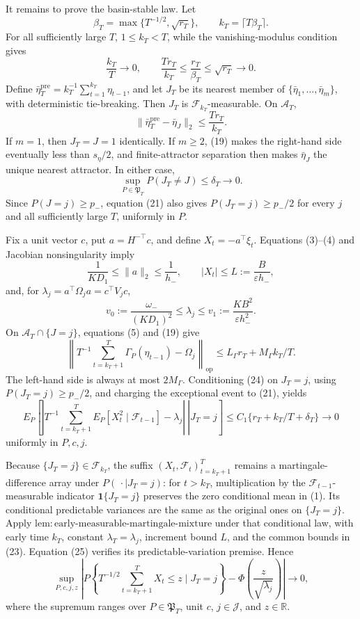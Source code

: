 It remains to prove the basin-stable law. Let
\[
 \beta_T=\max\{T^{-1/2},\sqrt{r_T}\},
 \qquad k_T=\lceil T\beta_T\rceil.
\tag{18}
\]
For all sufficiently large \(T\), \(1\le k_T<T\), while the vanishing-modulus condition gives
\[
 \frac{k_T}{T}\longrightarrow0,
 \qquad \frac{Tr_T}{k_T}\le\frac{r_T}{\beta_T}\le\sqrt{r_T}\longrightarrow0.
\tag{19}
\]
Define \(\bar\eta_T^{\mathrm{pre}}=k_T^{-1}\sum_{t=1}^{k_T}\eta_{t-1}\), and let \(J_T\) be its nearest member of \(\{\bar\eta_1,\ldots,\bar\eta_m\}\), with deterministic tie-breaking. Then \(J_T\) is \(\mathcal F_{k_T}\)-measurable. On \(\mathcal A_T\),
\[
 \|\bar\eta_T^{\mathrm{pre}}-\bar\eta_J\|_2
 \le\frac{Tr_T}{k_T}.
\tag{20}
\]
If \(m=1\), then \(J_T=J=1\) identically. If \(m\ge2\), (19) makes the right-hand side eventually less than \(s_\eta/2\), and finite-attractor separation then makes \(\bar\eta_J\) the unique nearest attractor. In either case,
\[
 \sup_{P\in\mathfrak P_T}P(J_T\ne J)\le\delta_T\longrightarrow0.
\tag{21}
\]
Since \(P(J=j)\ge p_-\), equation (21) also gives \(P(J_T=j)\ge p_-/2\) for every \(j\) and all sufficiently large \(T\), uniformly in \(P\).

Fix a unit vector \(c\), put \(a=H^{-\top}c\), and define \(X_t=-a^\top\xi_t\). Equations (3)--(4) and Jacobian nonsingularity imply
\[
 \frac1{KD_1}\le\|a\|_2\le\frac1{h_-},
 \qquad |X_t|\le L:=\frac{B}{\varepsilon h_-},
\tag{22}
\]
and, for \(\lambda_j=a^\top\Omega_ja=c^\top V_jc\),
\[
 v_0:=\frac{\omega_-}{(KD_1)^2}\le\lambda_j
 \le v_1:=\frac{KB^2}{\varepsilon h_-^2}.
\tag{23}
\]
On \(\mathcal A_T\cap\{J=j\}\), equations (5) and (19) give
\[
 \left\|T^{-1}\sum_{t=k_T+1}^T\Gamma_P(\eta_{t-1})-\Omega_j\right\|_{\mathrm{op}}
 \le L_\Gamma r_T+M_\Gamma k_T/T.
\tag{24}
\]
The left-hand side is always at most \(2M_\Gamma\). Conditioning (24) on \(J_T=j\), using \(P(J_T=j)\ge p_-/2\), and charging the exceptional event to (21), yields
\[
 E_P\!\left[\left.\left|T^{-1}\sum_{t=k_T+1}^T
 E_P[X_t^2\mid\mathcal F_{t-1}]-\lambda_j\right|\ \right|J_T=j\right]
 \le C_1\{r_T+k_T/T+\delta_T\}\longrightarrow0
\tag{25}
\]
uniformly in \(P,c,j\).

Because \(\{J_T=j\}\in\mathcal F_{k_T}\), the suffix \((X_t,\mathcal F_t)_{t=k_T+1}^T\) remains a martingale-difference array under \(P(\,\cdot\mid J_T=j)\): for \(t>k_T\), multiplication by the \(\mathcal F_{t-1}\)-measurable indicator \(\mathbf1\{J_T=j\}\) preserves the zero conditional mean in (1). Its conditional predictable variances are the same as the original ones on \(\{J_T=j\}\). Apply \(\mathrm{lem:early\text{-}measurable\text{-}martingale\text{-}mixture}\) under that conditional law, with early time \(k_T\), constant \(\lambda_T=\lambda_j\), increment bound \(L\), and the common bounds in (23). Equation (25) verifies its predictable-variation premise. Hence
\[
 \sup_{P,c,j,z}\left|P\!\left\{T^{-1/2}\sum_{t=k_T+1}^TX_t\le z\mid J_T=j\right\}
 -\Phi\!\left(\frac z{\sqrt{\lambda_j}}\right)\right|\longrightarrow0,
\tag{26}
\]
where the supremum ranges over \(P\in\mathfrak P_T\), unit \(c\), \(j\in\mathcal J\), and \(z\in\mathbb R\).

